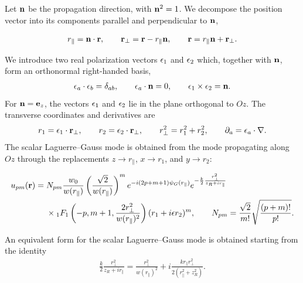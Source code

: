 Let ${\bf n}$ be the propagation direction, with ${\bf n}^2=1$. We decompose the position vector into its components parallel and perpendicular to ${\bf n}$,
\begin{importantbox}
    \begin{align}
        r_{\parallel}={\bf n}\cdot{\bf r},\qquad
        {\bf r}_{\perp}={\bf r}-r_{\parallel}{\bf n},\qquad
        {\bf r}=r_{\parallel}{\bf n}+{\bf r}_{\perp}.
    \end{align}
\end{importantbox}
We introduce two real polarization vectors ${\bf \epsilon}_1$ and ${\bf \epsilon}_2$ which, together with ${\bf n}$, form an orthonormal right-handed basis,
\begin{align}
    {\bf \epsilon}_a\cdot{\bf \epsilon}_b=\delta_{ab},\qquad
    {\bf \epsilon}_a\cdot{\bf n}=0,\qquad
    {\bf \epsilon}_1\times{\bf \epsilon}_2={\bf n}.
\end{align}
For ${\bf n}={\bf e}_z$, the vectors ${\bf \epsilon}_1$ and ${\bf \epsilon}_2$ lie in the plane orthogonal to $Oz$. The transverse coordinates and derivatives are
\begin{align}
    r_1={\bf \epsilon}_1\cdot{\bf r}_{\perp},\qquad
    r_2={\bf \epsilon}_2\cdot{\bf r}_{\perp},\qquad
    r_{\perp}^2=r_1^2+r_2^2,\qquad
    \partial_a={\bf \epsilon}_a\cdot{\bf \nabla}.
\end{align}
The scalar Laguerre--Gauss mode is obtained from the mode propagating along $Oz$ through the replacements $z\to r_{\parallel}$, $x\to r_1$, and $y\to r_2$:
\begin{importantbox}
    \begin{align}
        u_{pm}({\bf r})={} & N_{pm}\frac{w_0}{w(r_{\parallel})}
        \left(\frac{\sqrt{2}}{w(r_{\parallel})}\right)^m
        e^{-i(2p+m+1)\psi_G(r_{\parallel})}
        e^{-\frac{k}{2}\frac{r_{\perp}^2}{z_R+i r_{\parallel}}}\nonumber                              \\
                           & \times{}_1F_1\left(-p,m+1,\frac{2r_{\perp}^2}{w(r_{\parallel})^2}\right)
        (r_1+i\epsilon r_2)^m,
        \qquad
        N_{pm}=\frac{\sqrt{2}}{m!}\sqrt{\frac{(p+m)!}{p!}}.
    \end{align}

\end{importantbox}
An equivalent form for the scalar Laguerre--Gauss mode is obtained starting from the identity
\begin{align}
    \frac{k}{2}\frac{r_{\perp}^2}{z_R+i r_{\parallel}} = \frac{r_{\perp}^2}{w(r_{\parallel})^2} + i\frac{k r_{\parallel} r_{\perp}^2}{2 (r_{\parallel}^2 + z_R^2)}.
\end{align}

